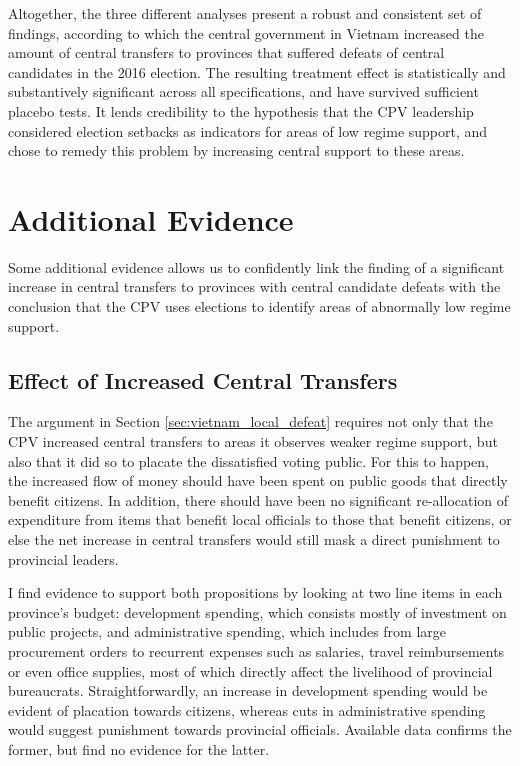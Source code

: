\documentclass[12pt]{article}
\newcommand{\1}{\mathbbm{1}}
\begin{document}
Altogether, the three different analyses present a robust and consistent set of findings, according to which the central government in Vietnam increased the amount of central transfers to provinces that suffered defeats of central candidates in the 2016 election. The resulting treatment effect is statistically and substantively significant across all specifications, and have survived sufficient placebo tests. It lends credibility to the hypothesis that the CPV leadership considered election setbacks as indicators for areas of low regime support, and chose to remedy this problem by increasing central support to these areas.

\section{Additional Evidence}
\label{sec:additional}

Some additional evidence allows us to confidently link the finding of a significant increase in central transfers to provinces with central candidate defeats with the conclusion that the CPV uses elections to identify areas of abnormally low regime support.

\subsection{Effect of Increased Central Transfers}

The argument in Section \ref{sec:vietnam_local_defeat} requires not only that the CPV increased central transfers to areas it observes weaker regime support, but also that it did so to placate the dissatisfied voting public. For this to happen, the increased flow of money should have been spent on public goods that directly benefit citizens. In addition, there should have been no significant re-allocation of expenditure from items that benefit local officials to those that benefit citizens, or else the net increase in central transfers would still mask a direct punishment to provincial leaders. 

I find evidence to support both propositions by looking at two line items in each province's budget: development spending, which consists mostly of investment on public projects, and administrative spending, which includes from large procurement orders to recurrent expenses such as salaries, travel reimbursements or even office supplies, most of which directly affect the livelihood of provincial bureaucrats. Straightforwardly, an increase in development spending would be evident of placation towards citizens, whereas cuts in administrative spending would suggest punishment towards provincial officials. Available data confirms the former, but find no evidence for the latter.
\end{document}
